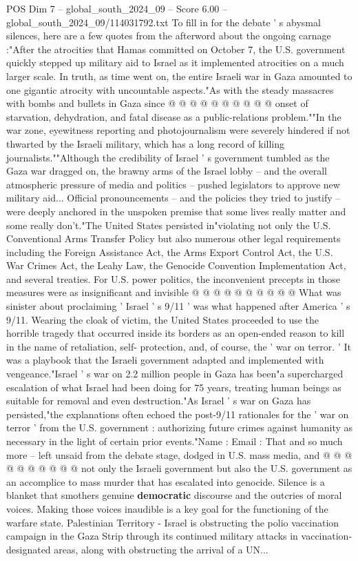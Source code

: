 \begin{textsample}{POS Dim 7 – global\_south\_2024\_09 – Score 6.00 – global\_south\_2024\_09/114031792.txt}
To fill in for the debate ' s abysmal silences, here are a few quotes from the afterword about the ongoing carnage :"After the atrocities that Hamas committed on October 7, the U.S. government quickly stepped up military aid to Israel as it implemented atrocities on a much larger scale.
In truth, as time went on, the entire Israeli war in Gaza amounted to one gigantic atrocity with uncountable aspects."As with the steady massacres with bombs and bullets in Gaza since @ @ @ @ @ @ @ @ @ @ onset of starvation, dehydration, and fatal disease as a public-relations problem.""In the war zone, eyewitness reporting and photojournalism were severely hindered if not thwarted by the Israeli military, which has a long record of killing journalists.""Although the credibility of Israel ' s government tumbled as the Gaza war dragged on, the brawny arms of the Israel lobby -- and the overall atmospheric pressure of media and politics -- pushed legislators to approve new military aid...
Official pronouncements -- and the policies they tried to justify -- were deeply anchored in the unspoken premise that some lives really matter and some really don't."The United States persisted in"violating not only the U.S.
Conventional Arms Transfer Policy but also numerous other legal requirements including the Foreign Assistance Act, the Arms Export Control Act, the U.S.
War Crimes Act, the Leahy Law, the Genocide Convention Implementation Act, and several treaties.
For U.S. power politics, the inconvenient precepts in those measures were as insignificant and invisible @ @ @ @ @ @ @ @ @ @ What was sinister about proclaiming ' Israel ' s 9/11 ' was what happened after America ' s 9/11.
Wearing the cloak of victim, the United States proceeded to use the horrible tragedy that occurred inside its borders as an open-ended reason to kill in the name of retaliation, self- protection, and, of course, the ' war on terror. ' It was a playbook that the Israeli government adapted and implemented with vengeance."Israel ' s war on 2.2 million people in Gaza has been"a supercharged escalation of what Israel had been doing for 75 years, treating human beings as suitable for removal and even destruction."As Israel ' s war on Gaza has persisted,"the explanations often echoed the post-9/11 rationales for the ' war on terror ' from the U.S. government : authorizing future crimes against humanity as necessary in the light of certain prior events."Name : Email : That and so much more -- left unsaid from the debate stage, dodged in U.S. mass media, and @ @ @ @ @ @ @ @ @ @ not only the Israeli government but also the U.S. government as an accomplice to mass murder that has escalated into genocide.
Silence is a blanket that smothers genuine \textbf{democratic} discourse and the outcries of moral voices.
Making those voices inaudible is a key goal for the functioning of the warfare state.
Palestinian Territory - Israel is obstructing the polio vaccination campaign in the Gaza Strip through its continued military attacks in vaccination-designated areas, along with obstructing the arrival of a UN...

\end{textsample}

